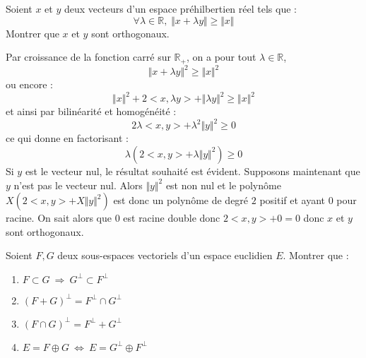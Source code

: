 \documentclass[a4paper,10pt]{report}
\begin{document}
\begin{Exercice}{} Soient $x$ et $y$ deux vecteurs d'un espace préhilbertien réel tels que :
$$ \forall \lambda \in \mathbb{R}, \; \Vert x+\lambda y \Vert \geq \Vert x \Vert$$
Montrer que $x$ et $y$ sont orthogonaux.
\end{Exercice}

\corr Par croissance de la fonction carré sur $\mathbb{R}_{+}$, on a pour tout $\lambda \in \mathbb{R}$,
$$ \Vert x+\lambda y \Vert^2 \geq \Vert x \Vert^2$$
ou encore :
$$ \Vert x \Vert^2 + 2  <x,\lambda y> + \Vert \lambda y \Vert^2 \geq \Vert x \Vert^2$$
et ainsi par bilinéarité et homogénéité :
$$ 2 \lambda <x,y> + \lambda^2 \Vert y \Vert^2 \geq 0$$
ce qui donne en factorisant :
$$ \lambda (2<x,y> + \lambda \Vert y \Vert^2) \geq 0$$
Si $y$ est le vecteur nul, le résultat souhaité est évident. Supposons maintenant que $y$ n'est pas le vecteur nul. Alors $\Vert y \Vert^2$ est non nul et le polynôme $X(2<x,y>+ X \Vert y \Vert^2)$ est donc un polynôme de degré $2$ positif et ayant $0$ pour racine. On sait alors que $0$ est racine double donc $2<x,y>+0=0$ donc $x$ et $y$ sont orthogonaux.


\begin{Exercice}{} Soient $F, G$ deux sous-espaces vectoriels d'un espace euclidien $E.$ Montrer que :

\begin{multicols}{2}
\begin{enumerate}
\item $F\subset G \ \Longrightarrow \ G^{\perp}\subset F^{\perp}$
\item $(F+G)^{\perp}=F^{\perp}\cap G^{\perp}$
\columnbreak
\item $(F\cap G)^{\perp}=F^{\perp}+G^{\perp}$
\item $E=F\oplus G \ \Longleftrightarrow \ E=G^{\perp}\oplus F^{\perp}$
\end{enumerate}
\end{multicols}
\end{Exercice}

\corr
\end{document}
